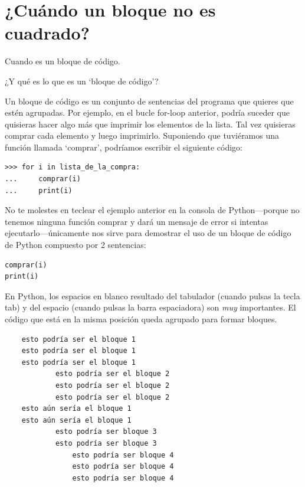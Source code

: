 \section{¿Cuándo un bloque no es cuadrado?}

Cuando es un bloque de código.
\par
\noindent
¿Y qué es lo que es un `bloque de código'?
\par
Un bloque de código es un conjunto de sentencias del programa que quieres que estén agrupadas.  Por ejemplo, en el bucle for-loop anterior, podría suceder que quisieras hacer algo más que imprimir los elementos de la lista.  Tal vez quisieras comprar cada elemento y luego imprimirlo.  Suponiendo que tuviéramos una función llamada `comprar', podríamos escribir el siguiente código:

\begin{listingignore}
\begin{verbatim}
>>> for i in lista_de_la_compra:
...     comprar(i)
...     print(i)
\end{verbatim}
\end{listingignore}

No te molestes en teclear el ejemplo anterior en la consola de Python---porque no tenemos ninguna función comprar y dará un mensaje de error si intentas ejecutarlo---únicamente nos sirve para demostrar el uso de un bloque de código de Python compuesto por 2 sentencias:

\begin{listingignore}
\begin{verbatim}
comprar(i)
print(i)
\end{verbatim}
\end{listingignore}

En Python, los espacios en blanco resultado del tabulador (cuando pulsas la tecla tab) y del espacio (cuando pulsas la barra espaciadora) son \emph{muy} importantes.  El código que está en la misma posición queda agrupado para formar bloques.

\begin{listing}
\begin{verbatim}
    esto podría ser el bloque 1
    esto podría ser el bloque 1
    esto podría ser el bloque 1
	        esto podría ser el bloque 2
	        esto podría ser el bloque 2
	        esto podría ser el bloque 2
    esto aún sería el bloque 1
    esto aún sería el bloque 1
	        esto podría ser bloque 3
	        esto podría ser bloque 3
	            esto podría ser bloque 4
	            esto podría ser bloque 4
	            esto podría ser bloque 4
\end{verbatim}
\end{listing}

